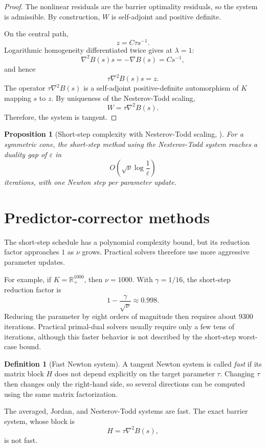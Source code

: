 \documentclass[a4paper,11pt]{book}
\theoremstyle{plain}
\newtheorem{proposition}[theorem]{Proposition}
\theoremstyle{definition}
\newtheorem{definition}[theorem]{Definition}
\theoremstyle{remark}
\numberwithin{equation}{chapter}
\numberwithin{algorithm}{chapter}
\newcommand{\R}{\mathbb{R}}
\begin{document}
	\begin{proof}
		The nonlinear residuals are the barrier optimality residuals, so the system
		is admissible. By construction, \(W\) is self-adjoint and positive definite.
		
		On the central path,
		\[
		z=C\tau s^{-1}.
		\]
		Logarithmic homogeneity differentiated twice gives at $\lambda =1$:
		\[
		\nabla^2B(s)s= -\nabla B(s)= Cs^{-1},
		\]
		and hence
		\[
		\tau\nabla^2B(s)s=z.
		\]
		The operator \(\tau\nabla^2B(s)\) is a self-adjoint positive-definite
		automorphism of \(K\) mapping \(s\) to \(z\). By uniqueness of the
		Nesterov-Todd scaling,
		\[
		W=\tau\nabla^2B(s).
		\]
		Therefore, the system is tangent.
	\end{proof}
	
	\begin{proposition}[Short-step complexity with Nesterov-Todd scaling,
		\cite{NesterovTodd1997}]
		For a symmetric cone, the short-step method using the Nesterov-Todd system
		reaches a duality gap of \(\varepsilon\) in
		\[
		O\left(
		\sqrt{\nu}\log\frac1{\varepsilon}
		\right)
		\]
		iterations, with one Newton step per parameter update.
	\end{proposition}
	
	\section{Predictor-corrector methods}
	
	The short-step schedule has a polynomial complexity bound, but its reduction
	factor approaches \(1\) as \(\nu\) grows. Practical solvers therefore use
	more aggressive parameter updates.
	
	For example, if \(K=\R_+^{1000}\), then \(\nu=1000\). With
	\(\gamma=1/16\), the short-step reduction factor is
	\[
	1-\frac{\gamma}{\sqrt{\nu}}
	\approx
	0.998.
	\]
	Reducing the parameter by eight orders of magnitude then requires about
	\(9300\) iterations. Practical primal-dual solvers usually require only a
	few tens of iterations, although this faster behavior is not described by
	the short-step worst-case bound.
	
	\begin{definition}[Fast Newton system]
		A tangent Newton system is called \emph{fast} if its matrix block \(H\)
		does not depend explicitly on the target parameter \(\tau\). Changing
		\(\tau\) then changes only the right-hand side, so several directions can be
		computed using the same matrix factorization.
		
		The averaged, Jordan, and Nesterov-Todd systems are fast. The exact barrier
		system, whose block is
		\[
		H=\tau\nabla^2B(s),
		\]
		is not fast.
	\end{definition}
	
\end{document}
